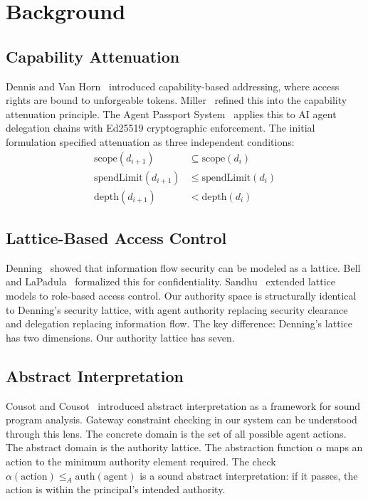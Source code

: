 \documentclass[sigconf,nonacm]{acmart}
\begin{document}
\section{Background}

\subsection{Capability Attenuation}

Dennis and Van Horn~\cite{dennis1966} introduced capability-based addressing, where
access rights are bound to unforgeable tokens. Miller~\cite{miller2006} refined this
into the capability attenuation principle. The Agent Passport System~\cite{aeoess2026}
applies this to AI agent delegation chains with Ed25519 cryptographic enforcement.
The initial formulation specified attenuation as three independent conditions:
\begin{align}
\text{scope}(d_{i+1}) &\subseteq \text{scope}(d_i) \label{eq:scope} \\
\text{spendLimit}(d_{i+1}) &\leq \text{spendLimit}(d_i) \label{eq:spend} \\
\text{depth}(d_{i+1}) &< \text{depth}(d_i) \label{eq:depth}
\end{align}

\subsection{Lattice-Based Access Control}

Denning~\cite{denning1976} showed that information flow security can be modeled as a
lattice. Bell and LaPadula~\cite{bell1973} formalized this for confidentiality.
Sandhu~\cite{sandhu1993} extended lattice models to role-based access control. Our
authority space is structurally identical to Denning's security lattice, with agent
authority replacing security clearance and delegation replacing information flow. The
key difference: Denning's lattice has two dimensions. Our authority lattice has seven.

\subsection{Abstract Interpretation}

Cousot and Cousot~\cite{cousot1977} introduced abstract interpretation as a framework
for sound program analysis. Gateway constraint checking in our system can be understood
through this lens. The concrete domain is the set of all possible agent actions. The
abstract domain is the authority lattice. The abstraction function $\alpha$ maps an
action to the minimum authority element required. The check
$\alpha(\text{action}) \leq_A \text{auth}(\text{agent})$ is a sound abstract
interpretation: if it passes, the action is within the principal's intended authority.
\end{document}
